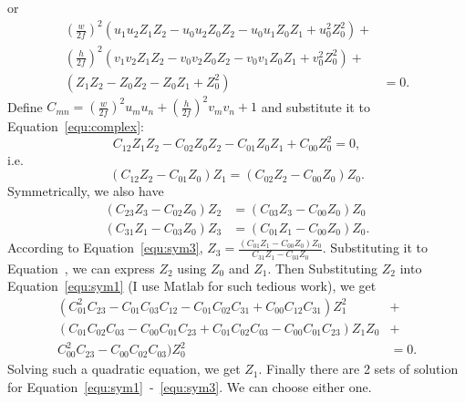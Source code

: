 \documentclass[a4paper]{article}
\begin{document}
or
\begin{align}
(\frac{w}{2f})^2(u_1u_2Z_1Z_2-u_0u_2Z_0Z_2-u_0u_1Z_0Z_1+u_0^2Z_0^2)+ & \nonumber\\
(\frac{h}{2f})^2(v_1v_2Z_1Z_2-v_0v_2Z_0Z_2-v_0v_1Z_0Z_1+v_0^2Z_0^2)+ & \nonumber\\
(Z_1Z_2-Z_0Z_2-Z_0Z_1+Z_0^2) &=0\label{equ:complex}.
\end{align}
Define $C_{mn}=(\frac{w}{2f})^2u_mu_n+(\frac{h}{2f})^2v_mv_n+1$ and substitute it to Equation~\ref{equ:complex}:
\begin{equation}
C_{12}Z_1Z_2-C_{02}Z_0Z_2-C_{01}Z_0Z_1+C_{00}Z_0^2=0,
\end{equation}
i.e.
\begin{equation}
(C_{12}Z_2-C_{01}Z_0)Z_1=(C_{02}Z_2-C_{00}Z_0)Z_0 \label{equ:sym1}.
\end{equation}
Symmetrically, we also have
\begin{align}
(C_{23}Z_3-C_{02}Z_0)Z_2&=(C_{03}Z_3-C_{00}Z_0)Z_0 \label{equ:sym2} \\
(C_{31}Z_1-C_{03}Z_0)Z_3&=(C_{01}Z_1-C_{00}Z_0)Z_0 \label{equ:sym3}.
\end{align}
According to Equation~\ref{equ:sym3}, $Z_3=\frac{(C_{01}Z_1-C_{00}Z_0)Z_0}{C_{31}Z_1-C_{03}Z_0}$. 
Substituting it to Equation~\label{equ:sym2}, we can express $Z_2$ using $Z_0$ and $Z_1$.
Then Substituting $Z_2$ into Equation~\ref{equ:sym1} (I use Matlab for such tedious work), we get
\begin{align}
(C_{01}^2C_{23}-C_{01}C_{03}C_{12}-C_{01}C_{02}C_{31}+C_{00}C_{12}C_{31})Z_1^2 & +\nonumber\\
(C_{01}C_{02}C_{03}-C_{00}C_{01}C_{23}+C_{01}C_{02}C_{03}-C_{00}C_{01}C_{23})Z_1Z_0 & + \nonumber\\
C_{00}^2C_{23}-C_{00}C_{02}C_{03})Z_0^2&=0.
\end{align}
Solving such a quadratic equation, we get $Z_1$. 
Finally there are 2 sets of solution for Equation~\ref{equ:sym1}~-~\ref{equ:sym3}.
We can choose either one.
\end{document}
